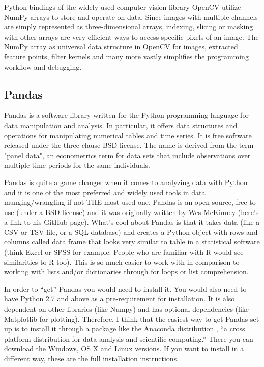 \documentclass[12pt,a4paper,final]{extreport}
\begin{document}
Python bindings of the widely used computer vision library OpenCV utilize NumPy arrays to store and operate on data. Since images with multiple channels are simply represented as three-dimensional arrays, indexing, slicing or masking with other arrays are very efficient ways to access specific pixels of an image. The NumPy array as universal data structure in OpenCV for images, extracted feature points, filter kernels and many more vastly simplifies the programming workflow and debugging. 






\subsection{Pandas}
Pandas is a software library written for the Python programming language for data manipulation and analysis. In particular, it offers data structures and operations for manipulating numerical tables and time series. It is free software released under the three-clause BSD license. The name is derived from the term "panel data", an econometrics term for data sets that include observations over multiple time periods for the same individuals.

Pandas is quite a game changer when it comes to analyzing data with Python and it is one of the most preferred and widely used tools in data munging/wrangling if not THE most used one. Pandas is an open source, free to use (under a BSD license) and it was originally written by Wes McKinney (here’s a link to his GitHub page). What’s cool about Pandas is that it takes data (like a CSV or TSV file, or a SQL database) and creates a Python object with rows and columns called data frame that looks very similar to table in a statistical software (think Excel or SPSS for example. People who are familiar with R would see similarities to R too). This is so much easier to work with in comparison to working with lists and/or dictionaries through for loops or list comprehension.

In order to “get” Pandas you would need to install it. You would also need to have Python 2.7 and above as a pre-requirement for installation. It is also dependent on other libraries (like Numpy) and has optional dependencies (like Matplotlib for plotting). Therefore, I think that the easiest way to get Pandas set up is to install it through a package like the Anaconda distribution , “a cross platform distribution for data analysis and scientific computing.” There you can download the Windows, OS X and Linux versions. If you want to install in a different way, these are the full installation instructions.
\end{document}

